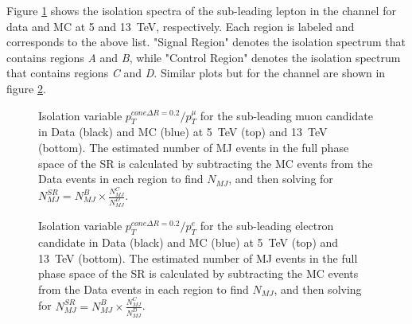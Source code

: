 Figure \ref{f:Iso_Zmm} shows the isolation spectra of the sub-leading lepton in the \Zmm channel for data and MC at 5 and 13~TeV, respectively. Each region is labeled and corresponds to the above list. "Signal Region" denotes the isolation spectrum that contains regions \textit{A} and \textit{B}, while "Control Region" denotes the isolation spectrum that contains regions \textit{C} and \textit{D}. Similar plots but for the \Zee channel are shown in figure \ref{f:Iso_Zee}. 
\begin{figure}[h]
\centering
{}


\caption{Isolation variable $p_{T}^{cone \Delta R=0.2}/p_{T}^{\mu}$ for the sub-leading muon candidate in Data (black) and MC (blue) at 5~TeV (top) and 13~TeV (bottom). The estimated number of MJ events in the full phase space of the SR is calculated by subtracting the MC events from the Data events in each region to find $N_{MJ}$, and then solving for $N_{MJ}^{SR} = N_{MJ}^{B} \times \frac{N_{MJ}^{C}}{N_{MJ}^{D}}$.}
\label{f:Iso_Zmm}
\end{figure}

\begin{figure}[h]
\centering
{}


\caption{Isolation variable $p_{T}^{cone \Delta R=0.2}/p_{T}^{e}$ for the sub-leading electron candidate in Data (black) and MC (blue) at 5~TeV (top) and 13~TeV (bottom). The estimated number of MJ events in the full phase space of the SR is calculated by subtracting the MC events from the Data events in each region to find $N_{MJ}$, and then solving for $N_{MJ}^{SR} = N_{MJ}^{B} \times \frac{N_{MJ}^{C}}{N_{MJ}^{D}}$.}
\label{f:Iso_Zee}
\end{figure}

